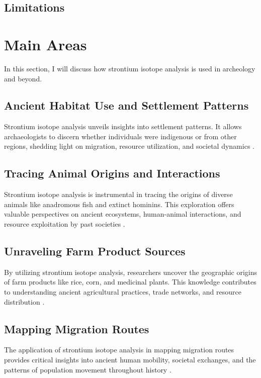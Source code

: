 \documentclass[a4paper, 12pt]{article}
\begin{document}
\subsection{Limitations}




\section{Main Areas}
In this section, I will discuss how strontium isotope analysis is used in archeology and beyond.

\subsection{Ancient Habitat Use and Settlement Patterns}
Strontium isotope analysis unveils insights into settlement patterns. It allows archaeologists to discern whether individuals were indigenous or from other regions, shedding light on migration, resource utilization, and societal dynamics \citep{crowley2017}.

\subsection{Tracing Animal Origins and Interactions}
Strontium isotope analysis is instrumental in tracing the origins of diverse animals like anadromous fish and extinct hominins. This exploration offers valuable perspectives on ancient ecosystems, human-animal interactions, and resource exploitation by past societies \citep{crowley2017}.

\subsection{Unraveling Farm Product Sources}
By utilizing strontium isotope analysis, researchers uncover the geographic origins of farm products like rice, corn, and medicinal plants. This knowledge contributes to understanding ancient agricultural practices, trade networks, and resource distribution \citep{crowley2017}.

\subsection{Mapping Migration Routes}
The application of strontium isotope analysis in mapping migration routes provides critical insights into ancient human mobility, societal exchanges, and the patterns of population movement throughout history \citep{crowley2017}.
\end{document}
